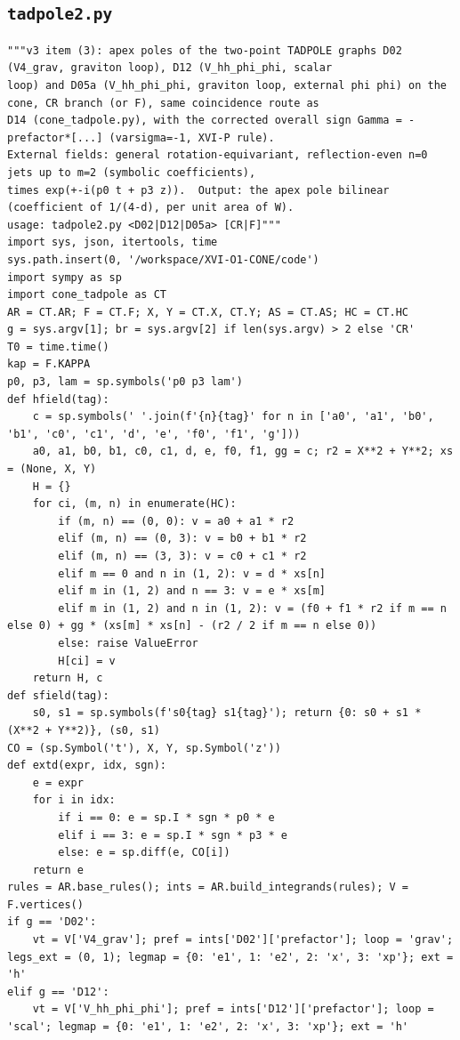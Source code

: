 \documentclass[10pt]{article}
\begin{document}
\subsection{\texttt{tadpole2.py}}
\begin{lstlisting}
"""v3 item (3): apex poles of the two-point TADPOLE graphs D02 (V4_grav, graviton loop), D12 (V_hh_phi_phi, scalar
loop) and D05a (V_hh_phi_phi, graviton loop, external phi phi) on the cone, CR branch (or F), same coincidence route as
D14 (cone_tadpole.py), with the corrected overall sign Gamma = -prefactor*[...] (varsigma=-1, XVI-P rule).
External fields: general rotation-equivariant, reflection-even n=0 jets up to m=2 (symbolic coefficients),
times exp(+-i(p0 t + p3 z)).  Output: the apex pole bilinear (coefficient of 1/(4-d), per unit area of W).
usage: tadpole2.py <D02|D12|D05a> [CR|F]"""
import sys, json, itertools, time
sys.path.insert(0, '/workspace/XVI-O1-CONE/code')
import sympy as sp
import cone_tadpole as CT
AR = CT.AR; F = CT.F; X, Y = CT.X, CT.Y; AS = CT.AS; HC = CT.HC
g = sys.argv[1]; br = sys.argv[2] if len(sys.argv) > 2 else 'CR'
T0 = time.time()
kap = F.KAPPA
p0, p3, lam = sp.symbols('p0 p3 lam')
def hfield(tag):
    c = sp.symbols(' '.join(f'{n}{tag}' for n in ['a0', 'a1', 'b0', 'b1', 'c0', 'c1', 'd', 'e', 'f0', 'f1', 'g']))
    a0, a1, b0, b1, c0, c1, d, e, f0, f1, gg = c; r2 = X**2 + Y**2; xs = (None, X, Y)
    H = {}
    for ci, (m, n) in enumerate(HC):
        if (m, n) == (0, 0): v = a0 + a1 * r2
        elif (m, n) == (0, 3): v = b0 + b1 * r2
        elif (m, n) == (3, 3): v = c0 + c1 * r2
        elif m == 0 and n in (1, 2): v = d * xs[n]
        elif m in (1, 2) and n == 3: v = e * xs[m]
        elif m in (1, 2) and n in (1, 2): v = (f0 + f1 * r2 if m == n else 0) + gg * (xs[m] * xs[n] - (r2 / 2 if m == n else 0))
        else: raise ValueError
        H[ci] = v
    return H, c
def sfield(tag):
    s0, s1 = sp.symbols(f's0{tag} s1{tag}'); return {0: s0 + s1 * (X**2 + Y**2)}, (s0, s1)
CO = (sp.Symbol('t'), X, Y, sp.Symbol('z'))
def extd(expr, idx, sgn):
    e = expr
    for i in idx:
        if i == 0: e = sp.I * sgn * p0 * e
        elif i == 3: e = sp.I * sgn * p3 * e
        else: e = sp.diff(e, CO[i])
    return e
rules = AR.base_rules(); ints = AR.build_integrands(rules); V = F.vertices()
if g == 'D02':
    vt = V['V4_grav']; pref = ints['D02']['prefactor']; loop = 'grav'; legs_ext = (0, 1); legmap = {0: 'e1', 1: 'e2', 2: 'x', 3: 'xp'}; ext = 'h'
elif g == 'D12':
    vt = V['V_hh_phi_phi']; pref = ints['D12']['prefactor']; loop = 'scal'; legmap = {0: 'e1', 1: 'e2', 2: 'x', 3: 'xp'}; ext = 'h'

\end{lstlisting}
\end{document}
